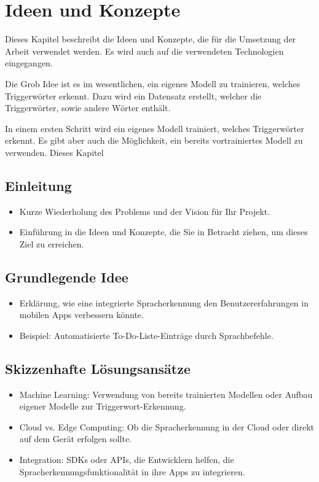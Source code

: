 \documentclass[11pt,a4paper]{article}
\begin{document}
\newpage \section{Ideen und Konzepte}
Dieses Kapitel beschreibt die Ideen und Konzepte, die für die Umsetzung der Arbeit verwendet
werden. Es wird auch auf die verwendeten Technologien eingegangen.

Die Grob Idee ist es im wesentlichen, ein eigenes Modell zu trainieren, welches Triggerwörter
erkennt. Dazu wird ein Datensatz erstellt, welcher die Triggerwörter, sowie andere Wörter
enthält.

In einem ersten Schritt wird ein eigenes Modell trainiert, welches Triggerwörter erkennt.
Es gibt aber auch die Möglichkeit, ein bereits vortrainiertes Modell zu verwenden. Dieses Kapitel
\subsection{Einleitung}
\begin{itemize}
    \item Kurze Wiederholung des Problems und der Vision für Ihr Projekt.
    \item Einführung in die Ideen und Konzepte, die Sie in Betracht ziehen, um dieses Ziel zu erreichen.
\end{itemize}

\subsection{Grundlegende Idee}
\begin{itemize}
    \item Erklärung, wie eine integrierte Spracherkennung den Benutzererfahrungen in mobilen Apps verbessern könnte.
    \item Beispiel: Automatisierte To-Do-Liste-Einträge durch Sprachbefehle.
\end{itemize}

\subsection{Skizzenhafte Lösungsansätze}
\begin{itemize}
    \item Machine Learning: Verwendung von bereits trainierten Modellen oder Aufbau eigener Modelle zur Triggerwort-Erkennung.
    \item Cloud vs. Edge Computing: Ob die Spracherkennung in der Cloud oder direkt auf dem Gerät erfolgen sollte.
    \item Integration: SDKs oder APIs, die Entwicklern helfen, die Spracherkennungsfunktionalität in ihre Apps zu integrieren.
\end{itemize}
\end{document}
